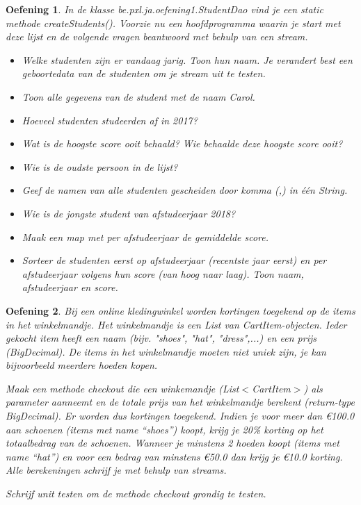 \documentclass{tstextbook}
\newtheorem{envoefening}{Oefening}[chapter]
\newenvironment{oefening}
               {\begin{boxexercise}\begin{envoefening}}
               {\end{envoefening}\end{boxexercise}}
\begin{document}
\begin{oefening}

In de klasse be.pxl.ja.oefening1.StudentDao vind je een static methode createStudents(). Voorzie nu een hoofdprogramma waarin je start met deze lijst en de volgende vragen beantwoord met behulp van een stream.

\begin{itemize}
\item Welke studenten zijn er vandaag jarig. Toon hun naam. Je verandert best een geboortedata van de studenten om je stream uit te testen.
\item Toon alle gegevens van de student met de naam Carol.
\item Hoeveel studenten studeerden af in 2017?
\item Wat is de hoogste score ooit behaald? Wie behaalde deze hoogste score ooit?
\item Wie is de oudste persoon in de lijst?
\item Geef de namen van alle studenten gescheiden door komma (,) in  \'e\'en String.
\item Wie is de jongste student van afstudeerjaar 2018?
\item Maak een map met per afstudeerjaar de gemiddelde score.
\item Sorteer de studenten eerst op afstudeerjaar (recentste jaar eerst) en per afstudeerjaar volgens hun score (van hoog naar laag). Toon naam, afstudeerjaar en score.
\end{itemize}
\end{oefening}

\begin{oefening}

Bij een online kledingwinkel worden kortingen toegekend op de items in het winkelmandje. 
Het winkelmandje is een List van CartItem-objecten. Ieder gekocht item heeft een naam (bijv. "shoes", "hat", "dress",...) en een prijs (BigDecimal).
De items in het winkelmandje moeten niet uniek zijn, je kan bijvoorbeeld meerdere hoeden kopen. 

Maak een methode checkout die een winkemandje (List$<$CartItem$>$) als parameter aanneemt en de totale prijs van het winkelmandje berekent (return-type BigDecimal). Er worden dus kortingen toegekend. Indien je voor meer dan €100.0 aan schoenen (items met name ``shoes'') koopt, krijg je 20\% korting op het totaalbedrag van de schoenen.
Wanneer je minstens 2 hoeden koopt (items met name ``hat'') en voor een bedrag van minstens €50.0 dan krijg je €10.0 korting. Alle berekeningen schrijf je met behulp van streams.

Schrijf unit testen om de methode checkout grondig te testen.
\end{oefening}
\end{document}
